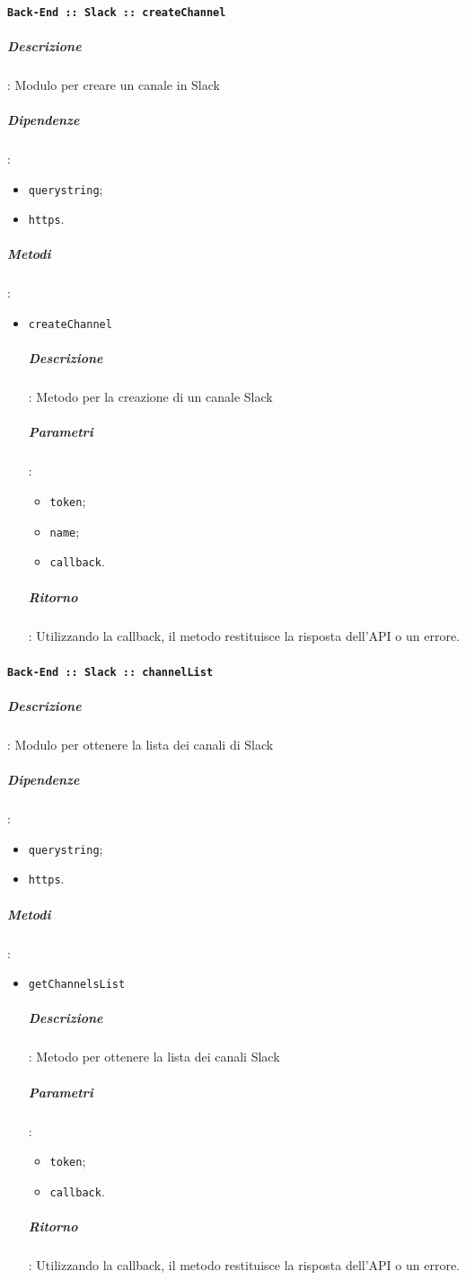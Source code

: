 \documentclass[../DefinizioneDiProdotto_v3.0.0.tex]{subfiles}
\begin{document}
\paragraph{\texttt{Back-End :: Slack :: createChannel}}
\subparagraph{Descrizione}: Modulo per creare un canale in Slack
\subparagraph{Dipendenze}:
\begin{itemize}
	\item \texttt{querystring};
	\item \texttt{https}.
\end{itemize}
\subparagraph{Metodi}:
\begin{itemize}
	\item \texttt{createChannel}
	      \subparagraph{Descrizione}: Metodo per la creazione di un canale Slack
	      \subparagraph{Parametri}:
	      \begin{itemize}
	      	\item \texttt{token};
	      	\item \texttt{name};
	      	\item \texttt{callback}.
	      \end{itemize}
	      \subparagraph{Ritorno}: Utilizzando la callback, il metodo restituisce la risposta dell'API o un errore.
\end{itemize}

\paragraph{\texttt{Back-End :: Slack :: channelList}}
\subparagraph{Descrizione}: Modulo per ottenere la lista dei canali di Slack
\subparagraph{Dipendenze}:
\begin{itemize}
	\item \texttt{querystring};
	\item \texttt{https}.
\end{itemize}
\subparagraph{Metodi}:
\begin{itemize}
	\item \texttt{getChannelsList}
	      \subparagraph{Descrizione}: Metodo per ottenere la lista dei canali Slack
	      \subparagraph{Parametri}:
	      \begin{itemize}
	      	\item \texttt{token};
	      	\item \texttt{callback}.
	      \end{itemize}
	      \subparagraph{Ritorno}: Utilizzando la callback, il metodo restituisce la risposta dell'API o un errore.
\end{itemize}
\end{document}
